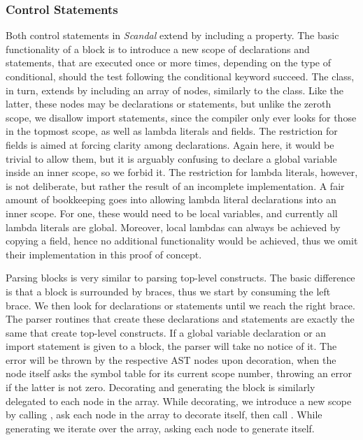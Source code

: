 \subsubsection{Control Statements}

Both control statements in \emph{Scandal} extend  by including a  property. The basic functionality of a block is to introduce a new scope of declarations and statements, that are executed once or more times, depending on the type of conditional, should the test following the conditional keyword succeed. The  class, in turn, extends  by including an array of nodes, similarly to the  class. Like the latter, these nodes may be declarations or statements, but unlike the zeroth scope, we disallow import statements, since the compiler only ever looks for those in the topmost scope, as well as lambda literals and fields. The restriction for fields is aimed at forcing clarity among declarations. Again here, it would be trivial to allow them, but it is arguably confusing to declare a global variable inside an inner scope, so we forbid it. The restriction for lambda literals, however, is not deliberate, but rather the result of an incomplete implementation. A fair amount of bookkeeping goes into allowing lambda literal declarations into an inner scope. For one, these would need to be local variables, and currently all lambda literals are global. Moreover, local lambdas can always be achieved by copying a field, hence no additional functionality would be achieved, thus we omit their implementation in this proof of concept.

Parsing blocks is very similar to parsing top-level constructs. The basic difference is that a block is surrounded by braces, thus we start by consuming the left brace. We then look for declarations or statements until we reach the right brace. The parser routines that create these declarations and statements are exactly the same that create top-level constructs. If a global variable declaration or an import statement is given to a block, the parser will take no notice of it. The error will be thrown by the respective AST nodes upon decoration, when the node itself asks the symbol table for its current scope number, throwing an error if the latter is not zero. Decorating and generating the block is similarly delegated to each node in the  array. While decorating, we introduce a new scope by calling , ask each node in the  array to decorate itself, then call . While generating we iterate over the  array, asking each node to generate itself.

